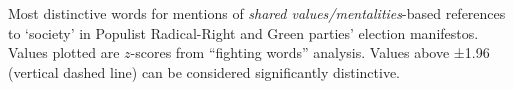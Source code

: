 Most distinctive words for mentions of \emph{shared values/mentalities}-based references to `society' in Populist Radical-Right and Green parties' election manifestos.  Values plotted are $z$-scores from ``fighting words'' analysis. Values above ±1.96 (vertical dashed line) can be considered significantly distinctive.